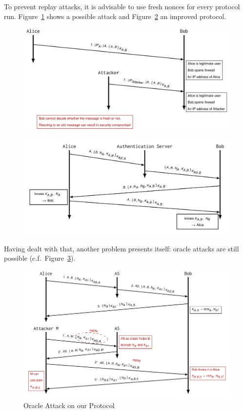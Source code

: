 To prevent replay attacks, it is advisable to use fresh nonces for every protocol run.
Figure~\ref{fig:oopp_replay_attack} shows a possible attack and Figure~\ref{fig:ooppt2} an improved protocol.
\begin{figure}[H]
  \centering
  \includegraphics[width=\textwidth]{figures/oopp_replay_attack.png}
  \label{fig:oopp_replay_attack}
\end{figure}
\begin{figure}[H]
  \centering
  \includegraphics[width=\textwidth]{figures/ooppt2.png}
  \label{fig:ooppt2}
\end{figure}

Having dealt with that, another problem presents itself: oracle attacks are still possible (c.f.\ Figure~\ref{fig:oopp_oracle_attack}).
\begin{figure}[H]
  \centering
  \includegraphics[width=\textwidth]{figures/oopp_oracle_attack.png}
  \caption{Oracle Attack on our Protocol}\label{fig:oopp_oracle_attack}
\end{figure}
\newpage

